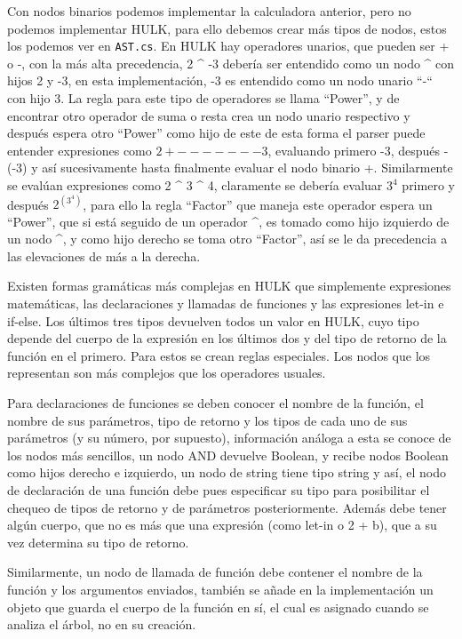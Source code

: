 \documentclass{article}
\begin{document}
Con nodos binarios podemos implementar la calculadora anterior, pero no podemos implementar HULK, para ello debemos crear más tipos de nodos, estos los podemos ver en \texttt{AST.cs}. En HULK hay operadores unarios, que pueden ser + o -, con la más alta precedencia,  2 \^{} -3  debería ser entendido como un nodo \^{} con hijos 2 y -3, en esta implementación, -3 es entendido como un nodo unario “-“ con hijo 3. La regla para este tipo de operadores se llama “Power”, y de encontrar otro operador de suma o resta crea un nodo unario respectivo y después espera otro “Power” como hijo de este de esta forma el parser puede entender expresiones como $ 2 + -------3 $, evaluando primero -3, después -(-3) y así sucesivamente hasta finalmente evaluar el nodo binario +. Similarmente se evalúan expresiones como 2 \^{} 3 \^{} 4, claramente se debería evaluar $3 ^ 4$ primero y después $2 ^{ (3 ^ 4)} $, para ello la regla “Factor” que maneja este operador espera un “Power”, que si está seguido de un operador \^{}, es tomado como hijo izquierdo de un nodo \^{}, y como hijo derecho se toma otro “Factor”, así se le da precedencia a las elevaciones de más a la derecha.

Existen formas gramáticas más complejas en HULK que simplemente expresiones matemáticas, las declaraciones y llamadas de funciones y las expresiones let-in e if-else. Los últimos tres tipos devuelven todos un valor en HULK, cuyo tipo depende del cuerpo de la expresión en los últimos dos y del tipo de retorno de la función en el primero. Para estos se crean reglas especiales. Los nodos que los representan son más complejos que los operadores usuales. 

Para declaraciones de funciones se deben conocer el nombre de la función, el nombre de sus parámetros, tipo de retorno y los tipos de cada uno de sus parámetros (y su número, por supuesto), información análoga a esta se conoce de los nodos más sencillos, un nodo AND devuelve Boolean, y recibe nodos Boolean como hijos derecho e izquierdo, un nodo de string tiene tipo string y así, el nodo de declaración de una función debe pues especificar su tipo para posibilitar el chequeo de tipos de retorno y de parámetros posteriormente. Además debe tener algún cuerpo, que no es más que una expresión (como let-in o 2 + b), que a su vez determina su tipo de retorno. 

Similarmente, un nodo de llamada de función debe contener el nombre de la función y los argumentos enviados, también se añade en la implementación un objeto que guarda el cuerpo de la función en sí, el cual es asignado cuando se analiza el árbol, no en su creación.
\end{document}
